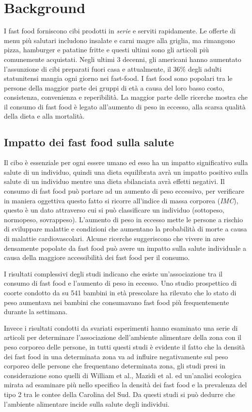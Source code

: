 \section{Background}
I fast food forniscono cibi prodotti in \emph{serie} e serviti rapidamente. Le offerte di menu più salutari includono insalate e carni magre alla griglia, ma rimangono pizza, hamburger e patatine fritte e questi ultimi sono gli articoli più comunemente acquistati. 
Negli ultimi 3 decenni, gli americani hanno aumentato l'assunzione di cibi preparati fuori casa e attualmente, il 36\% degli adulti statunitensi mangia ogni giorno nei fast-food.  
I fast food sono popolari tra le persone della maggior parte dei gruppi di età a causa del loro basso costo, consistenza, convenienza e reperibilità. La maggior parte delle ricerche mostra che il consumo di fast food è legato all'aumento di peso in eccesso, alla scarsa qualità della dieta e alla mortalità.

\subsection{Impatto dei fast food sulla salute}
Il cibo è essenziale per ogni essere umano ed esso ha un impatto significativo sulla salute di un individuo, quindi una dieta equilibrata avrà un impatto positivo sulla salute di un individuo mentre una dieta sbilanciata avrà effetti negativi.
Il consumo di fast food può portare ad un aumento di peso eccessivo, per verificare in maniera oggettiva questo fatto si ricorre all'indice di massa corporea (\emph{IMC}), questo è un dato attraverso cui si può classificare un individuo (sottopeso, normopeso, sovrappeso). L'aumento di peso in eccesso mette le persone a rischio di sviluppare malattie e condizioni che aumentano la probabilità di morte a causa di malattie cardiovascolari.
Alcune ricerche suggeriscono che vivere in aree densamente popolate da fast food può avere un impatto sulla salute individuale a causa della maggiore accessibilità dei fast food per il consumo.

I risultati complessivi degli studi indicano che esiste un'associazione tra il consumo di fast food e l'aumento di peso in eccesso. Uno studio prospettico di coorte condotto da su 541 bambini in età prescolare ha rilevato che lo stato di peso aumentava nei bambini che consumavano fast food più frequentemente durante la settimana.

Invece i risultati condotti da svariati esperimenti hanno esaminato una serie di articoli per determinare l'associazione dell'ambiente alimentare della zona con il peso corporeo delle persone, in tutti questi studi è evidente il fatto che la densità dei fast food in una determinata zona va ad influire negativamente sul peso corporeo delle persone che frequentano determinata zona, gli studi presi in considerazione sono quelli di William et al., Mazidi et al. ed un'analisi ecologica mirata ad esaminare più nello specifico la densità dei fast food e la prevalenza del tipo 2 tra le contee della Carolina del Sud.
Da questi studi si può dedurre che l'ambiente alimentare incide sulla salute degli individui.

